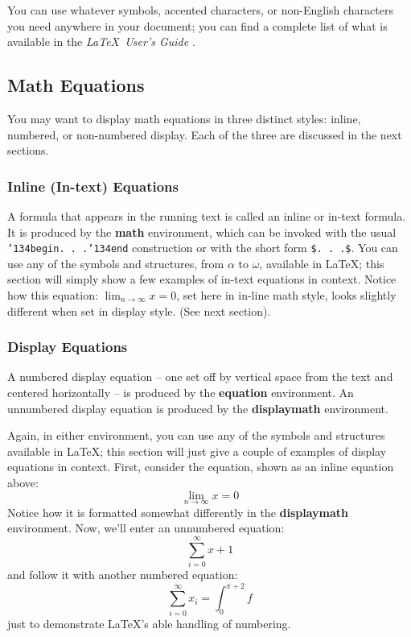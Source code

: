 \documentclass[twoside,letterpaper]{soups}
\begin{document}
You can use whatever symbols, accented characters, or
non-English characters you need anywhere in your document;
you can find a complete list of what is
available in the \textit{\LaTeX\
User's Guide} \cite{Lamport:LaTeX}.

\subsection{Math Equations}
You may want to display math equations in three distinct styles:
inline, numbered, or non-numbered display.  Each of
the three are discussed in the next sections.

\subsubsection{Inline (In-text) Equations}
A formula that appears in the running text is called an
inline or in-text formula.  It is produced by the
\textbf{math} environment, which can be
invoked with the usual \texttt{{\char'134}begin. . .{\char'134}end}
construction or with the short form \texttt{\$. . .\$}. You
can use any of the symbols and structures,
from $\alpha$ to $\omega$, available in
\LaTeX\cite{Lamport:LaTeX}; this section will simply show a
few examples of in-text equations in context. Notice how
this equation: \begin{math}\lim_{n\rightarrow \infty}x=0\end{math},
set here in in-line math style, looks slightly different when
set in display style.  (See next section).

\subsubsection{Display Equations}
A numbered display equation -- one set off by vertical space
from the text and centered horizontally -- is produced
by the \textbf{equation} environment. An unnumbered display
equation is produced by the \textbf{displaymath} environment.

Again, in either environment, you can use any of the symbols
and structures available in \LaTeX; this section will just
give a couple of examples of display equations in context.
First, consider the equation, shown as an inline equation above:
\begin{equation}\lim_{n\rightarrow \infty}x=0\end{equation}
Notice how it is formatted somewhat differently in
the \textbf{displaymath}
environment.  Now, we'll enter an unnumbered equation:
\begin{displaymath}\sum_{i=0}^{\infty} x + 1\end{displaymath}
and follow it with another numbered equation:
\begin{equation}\sum_{i=0}^{\infty}x_i=\int_{0}^{\pi+2} f\end{equation}
just to demonstrate \LaTeX's able handling of numbering.
\end{document}
